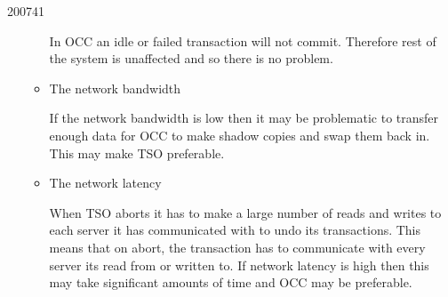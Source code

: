\documentclass[10pt,\jkfside,a4paper]{article}
\begin{document}
\begin{examquestion}{2007}{4}{1}
\begin{enumerate}[label=(\alph*)]
\begin{itemize}
In OCC an idle or failed transaction will not commit. Therefore rest of the
system is unaffected and so there is no problem.

\item The network bandwidth

If the network bandwidth is low then it may be problematic to transfer
enough data for OCC to make shadow copies and swap them back in. This may make
TSO preferable.

\item The network latency

When TSO aborts it has to make a large number of reads and writes to each
server it has communicated with to undo its transactions. This means that on
abort, the transaction has to communicate with every server its read from or
written to. If network latency is high then this may take significant
amounts of time and OCC may be preferable.

\end{itemize}

\end{enumerate}

\end{examquestion}
\end{document}
